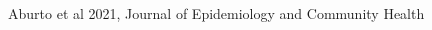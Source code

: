 \documentclass[xcolor={dvipsnames}]{beamer}
\begin{document}
\begin{frame}
\begin{center}
\begin{columns}
			\begin{column}{0.25\textwidth}
			\end{column}
		\end{columns}
	\end{center}

\tiny{Aburto et al 2021, Journal of Epidemiology and Community Health}
		
\end{frame}
\end{document}
